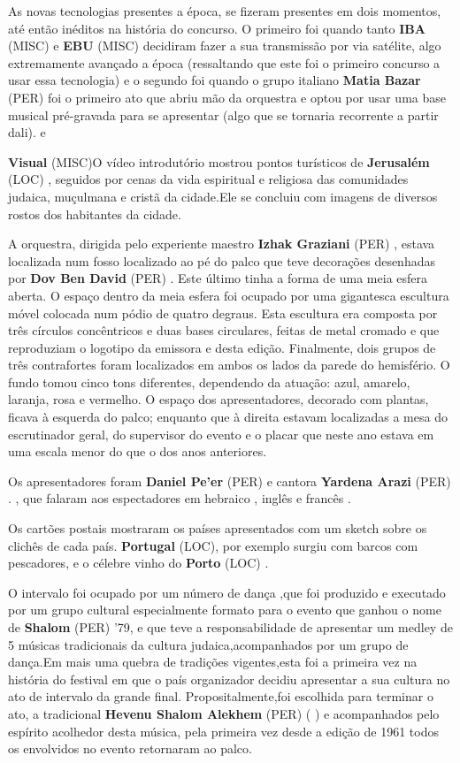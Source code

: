 \documentclass[12pt,a4paper]{article}
\begin{document}
As novas tecnologias presentes a época, se fizeram presentes em dois momentos, até então inéditos na história do concurso. O primeiro foi quando tanto \textbf{IBA} (MISC) e \textbf{EBU} (MISC) decidiram fazer a sua transmissão por via satélite, algo extremamente avançado a época (ressaltando que este foi o primeiro concurso a usar essa tecnologia) e o segundo foi quando o grupo italiano \textbf{Matia Bazar} (PER) foi o primeiro ato que abriu mão da orquestra e optou por usar uma base musical pré-gravada para se apresentar (algo que se tornaria recorrente a partir dali). e



\textbf{Visual} (MISC)O vídeo introdutório mostrou pontos turísticos de \textbf{Jerusalém} (LOC) , seguidos por cenas da vida espiritual e religiosa das comunidades judaica, muçulmana e cristã da cidade.Ele se concluiu com imagens de diversos rostos dos habitantes da cidade.

A orquestra, dirigida pelo experiente maestro \textbf{Izhak Graziani} (PER) , estava localizada num fosso localizado ao pé do palco que teve decorações desenhadas por \textbf{Dov Ben David} (PER) . Este último tinha a forma de uma meia esfera aberta. O espaço dentro da meia esfera foi ocupado por uma gigantesca escultura móvel colocada num pódio de quatro degraus. Esta escultura era composta por três círculos concêntricos e duas bases circulares, feitas de metal cromado e que reproduziam o logotipo da emissora e desta edição. Finalmente, dois grupos de três contrafortes foram localizados em ambos os lados da parede do hemisfério. O fundo tomou cinco tons diferentes, dependendo da atuação: azul, amarelo, laranja, rosa e vermelho. O espaço dos apresentadores, decorado com plantas, ficava à esquerda do palco; enquanto que à direita estavam localizadas a mesa do escrutinador geral, do supervisor do evento e o placar que neste ano estava em uma escala menor do que o dos anos anteriores.

Os apresentadores foram \textbf{Daniel Pe'er} (PER) e cantora \textbf{Yardena Arazi} (PER) . , que falaram aos espectadores em hebraico , inglês e francês .

Os cartões postais mostraram os países apresentados com um sketch sobre os clichês de cada país. \textbf{Portugal} (LOC), por exemplo surgiu com barcos com pescadores, e o célebre vinho do \textbf{Porto} (LOC) .

O intervalo foi ocupado por um número de dança ,que foi produzido e executado por um grupo cultural especialmente formato para o evento que ganhou o nome de \textbf{Shalom} (PER) '79, e que teve a responsabilidade de apresentar um medley de 5 músicas tradicionais da cultura judaica,acompanhados por um grupo de dança.Em mais uma quebra de tradições vigentes,esta foi a primeira vez na história do festival em que o país organizador decidiu apresentar a sua cultura no ato de intervalo da grande final. Propositalmente,foi escolhida para terminar o ato, a tradicional \textbf{Hevenu Shalom Alekhem} (PER) (    ) e acompanhados pelo espírito acolhedor desta música, pela primeira vez desde a edição de 1961 todos os envolvidos no evento retornaram ao palco.
\end{document}
